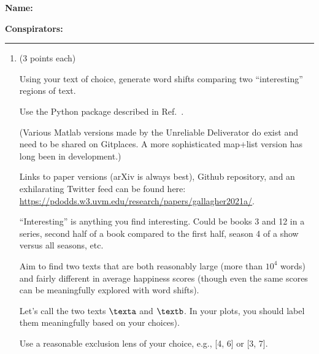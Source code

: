 \textbf{Name:} \\

\medskip

\textbf{Conspirators:} 

\medskip
\medskip

\hrule

\medskip


\assignmentsonly{\pleasesubmitprojectdraft}



\begin{enumerate}

\item (3 points each)

  Using your text of choice, generate word shifts comparing two ``interesting'' regions of text.

  Use the Python package described in Ref.~\cite{gallagher2021a}.

  (Various Matlab versions made by the Unreliable Deliverator do exist and need to be shared on Gitplaces. A more sophisticated map+list version has long been in development.)

  Links to paper versions (arXiv is always best),
  Github repository,
  and an
  exhilarating Twitter feed
  can be found here: \url{https://pdodds.w3.uvm.edu/research/papers/gallagher2021a/}.

  ``Interesting'' is anything you find interesting.  Could be books 3 and 12 in a series,
  second half of a book compared to the first half, season 4 of a show versus all seasons, etc.

  Aim to find two texts that are both reasonably large (more than $10^{4}$ words)
  and fairly different in average happiness scores (though even the same scores can be
  meaningfully explored with word shifts).
  
  Let's call the two texts
  $\texta$
  and
  $\textb$.
  In your plots, you should label them meaningfully based on your choices).

  Use a reasonable exclusion lens of your choice, e.g., [4, 6] or [3, 7].


\end{enumerate}
